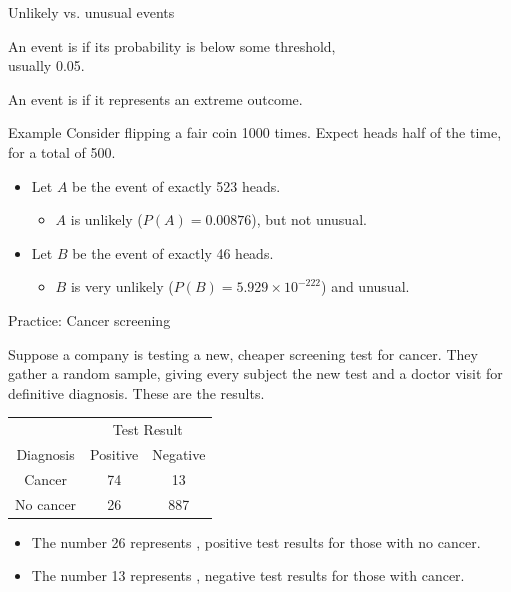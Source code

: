 \documentclass[xcolor=table]{beamer}
\begin{document}
\begin{frame}{Unlikely vs. unusual events}
\begin{block}{}
\large An event is  if its probability is below some threshold,\\ usually 0.05.
\end{block}

\begin{block}{}
\large An event is  if it represents an extreme outcome.
\end{block}

\pause

\begin{exampleblock}{Example}
Consider flipping a fair coin 1000 times. Expect heads half of the time, for a total of 500.

\begin{itemize}
\pause
\item Let $A$ be the event of exactly 523 heads.
\begin{itemize}
\pause
\item $A$ is unlikely ($P(A) = 0.00876$), but not unusual.
\end{itemize}

\pause
\item  Let $B$ be the event of exactly 46 heads.
\begin{itemize}
\pause
\item $B$ is very unlikely ($P(B) = 5.929 \times 10^{-222}$) and unusual.
\end{itemize}
\end{itemize}
\end{exampleblock}
\end{frame}

\begin{frame}{Practice: Cancer screening}
\begin{block}{}
Suppose a company is testing a new, cheaper screening test for cancer. They gather a random sample, giving every subject the new test and a doctor visit for definitive diagnosis. These are the results.\\
\medskip
{\centering
\begin{tabular}{c | c  c}
\multicolumn{1}{c}{} & \multicolumn{2}{c}{Test Result}\\
Diagnosis & Positive & Negative\\
\hline
Cancer & 74 & 13\\
No cancer & 26 & 887 \\
\end{tabular}\par
}
\smallskip
\begin{itemize}
\pause
\item The number 26 represents , positive test results for those with no cancer.
\pause
\item The number 13 represents , negative test results for those with cancer.
\end{itemize}
\end{block}
\end{frame}
\end{document}
